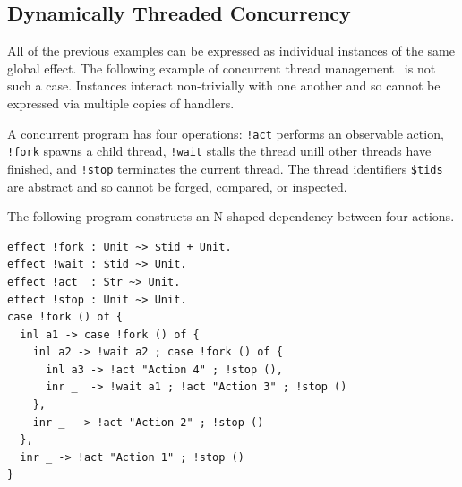 \documentclass[acmsmall,screen,review,anonymous]{acmart}
\begin{document}
\subsection{Dynamically Threaded Concurrency} \label{sec:concurrency}

All of the previous examples can be expressed as individual instances of the same global effect.
The following example of concurrent thread management~\cite{kammar2025equational} is not such a case.
Instances interact non-trivially with one another and so cannot be expressed via multiple copies of handlers.

A concurrent program has four operations: \lstinline{!act} performs an observable action, \lstinline{!fork} spawns a child thread,
\lstinline{!wait} stalls the thread unill other threads have finished, and \lstinline{!stop} terminates the current thread.
The thread identifiers \lstinline|$tids| are abstract and so cannot be forged, compared, or inspected.

The following program constructs an N-shaped dependency between four actions.

\begin{lstlisting}
effect !fork : Unit ~> $tid + Unit.
effect !wait : $tid ~> Unit.
effect !act  : Str ~> Unit.
effect !stop : Unit ~> Unit.
case !fork () of {
  inl a1 -> case !fork () of {
    inl a2 -> !wait a2 ; case !fork () of {
      inl a3 -> !act "Action 4" ; !stop (),
      inr _  -> !wait a1 ; !act "Action 3" ; !stop ()
    },
    inr _  -> !act "Action 2" ; !stop ()
  },
  inr _ -> !act "Action 1" ; !stop ()
}
\end{lstlisting}
\end{document}
